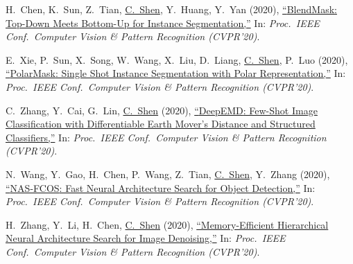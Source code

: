 \documentclass[9pt, a4paper]{article}
\newcommand{\years}[1]{\marginnote{\scriptsize #1}}
\def\highlight{\uline}
\begin{document}
\medskip

\years{2020} H.~Chen, K.~Sun, Z.~Tian, \highlight{C.~Shen}, Y.~Huang, Y.~Yan (2020),
\href{http://www.google.com/search?lr=&ie=UTF-8&oe=UTF-8&q=BlendMask%3A+Top-Down+Meets+Bottom-Up+for+Instance+Segmentation+Hao+Chen%2C+Kunyang+Sun%2C+Zhi+Tian%2C+Chunhua+Shen%2C+Yongming+Huang%2C+Youliang+Yan}{``{BlendMask}: Top-Down Meets Bottom-Up for Instance Segmentation,{}''}
In: \emph{Proc.\ IEEE Conf.\  Computer Vision \& Pattern Recognition (CVPR'20)}.

\medskip

\years{2020} E.~Xie, P.~Sun, X.~Song, W.~Wang, X.~Liu, D.~Liang, \highlight{C.~Shen}, P.~Luo (2020),
\href{http://www.google.com/search?lr=&ie=UTF-8&oe=UTF-8&q=PolarMask%3A+Single+Shot+Instance+Segmentation+with+Polar+Representation+Xie%2C+Enze%2C+Sun%2C+Peize%2C+Song%2C+Xiaoge%2C+Wang%2C+Wenhai%2C+Liu%2C+Xuebo%2C+Liang%2C+Ding%2C+Shen%2C+Chunhua%2C+Luo%2C+Ping}{``{PolarMask}: Single Shot Instance Segmentation with Polar Representation,{}''}
In: \emph{Proc.\ IEEE Conf.\  Computer Vision \& Pattern Recognition (CVPR'20)}.

\medskip

\years{2020} C.~Zhang, Y.~Cai, G.~Lin, \highlight{C.~Shen} (2020),
\href{http://www.google.com/search?lr=&ie=UTF-8&oe=UTF-8&q=DeepEMD%3A+Few-Shot+Image+Classification+with+Differentiable+Earth+Mover%27s+Distance+and+Structured+Classifiers+Chi+Zhang%2C+Yujun+Cai%2C+Guosheng+Lin%2C+Chunhua+Shen}{``{DeepEMD}: Few-Shot Image Classification with Differentiable Earth Mover's Distance and Structured Classifiers,{}''}
In: \emph{Proc.\ IEEE Conf.\  Computer Vision \& Pattern Recognition (CVPR'20)}.

\medskip

\years{2020} N.~Wang, Y.~Gao, H.~Chen, P.~Wang, Z.~Tian, \highlight{C.~Shen}, Y.~Zhang (2020),
\href{http://www.google.com/search?lr=&ie=UTF-8&oe=UTF-8&q=NAS-FCOS%3A+Fast+Neural+Architecture+Search+for+Object+Detection+Ning+Wang%2C+Yang+Gao%2C+Hao+Chen%2C+Peng+Wang%2C+Zhi+Tian%2C+Chunhua+Shen%2C+Yanning+Zhang}{``{NAS-FCOS}: Fast Neural Architecture Search for Object Detection,{}''}
In: \emph{Proc.\ IEEE Conf.\  Computer Vision \& Pattern Recognition (CVPR'20)}.

\medskip

\years{2020} H.~Zhang, Y.~Li, H.~Chen, \highlight{C.~Shen} (2020),
\href{http://www.google.com/search?lr=&ie=UTF-8&oe=UTF-8&q=Memory-Efficient+Hierarchical+Neural+Architecture+Search+for+Image+Denoising+Haokui+Zhang%2C+Ying+Li%2C+Hao+Chen%2C+Chunhua+Shen}{``Memory-Efficient Hierarchical Neural Architecture Search for Image Denoising,{}''}
In: \emph{Proc.\ IEEE Conf.\  Computer Vision \& Pattern Recognition (CVPR'20)}.
\end{document}

